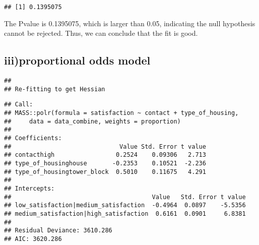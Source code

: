 \documentclass[]{article}
\newenvironment{Shaded}{\begin{snugshade}}{\end{snugshade}}
\newcommand{\KeywordTok}[1]{\textcolor[rgb]{0.13,0.29,0.53}{\textbf{#1}}}
\newcommand{\DataTypeTok}[1]{\textcolor[rgb]{0.13,0.29,0.53}{#1}}
\newcommand{\StringTok}[1]{\textcolor[rgb]{0.31,0.60,0.02}{#1}}
\newcommand{\OperatorTok}[1]{\textcolor[rgb]{0.81,0.36,0.00}{\textbf{#1}}}
\newcommand{\NormalTok}[1]{#1}
\begin{document}
\begin{verbatim}
## [1] 0.1395075
\end{verbatim}

The Pvalue is 0.1395075, which is larger than 0.05, indicating the null
hypothesis cannot be rejected. Thus, we can conclude that the fit is
good.

\subsection{iii)proportional odds
model}\label{iiiproportional-odds-model}

\begin{Shaded}
\end{Shaded}

\begin{verbatim}
## 
## Re-fitting to get Hessian
\end{verbatim}

\begin{verbatim}
## Call:
## MASS::polr(formula = satisfaction ~ contact + type_of_housing, 
##     data = data_combine, weights = proportion)
## 
## Coefficients:
##                              Value Std. Error t value
## contacthigh                 0.2524    0.09306   2.713
## type_of_housinghouse       -0.2353    0.10521  -2.236
## type_of_housingtower_block  0.5010    0.11675   4.291
## 
## Intercepts:
##                                       Value   Std. Error t value
## low_satisfaction|medium_satisfaction  -0.4964  0.0897    -5.5356
## medium_satisfaction|high_satisfaction  0.6161  0.0901     6.8381
## 
## Residual Deviance: 3610.286 
## AIC: 3620.286
\end{verbatim}
\end{document}
